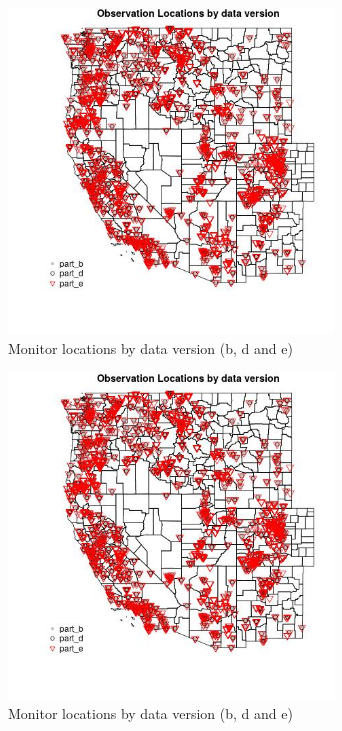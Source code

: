 
\begin{figure} 
\centering  
\includegraphics[width=0.77\textwidth]{Code_Outputs/PM25_obs_locations_by_data_version_Obs_Locations_versions_bde.jpg} 
\caption{\label{fig:PM25_obs_locations_by_data_versionObs_Locations_versions_bde}Monitor locations by data version (b, d and e)} 
\end{figure} 
 

\begin{figure} 
\centering  
\includegraphics[width=0.77\textwidth]{Code_Outputs/PM25_obs_locations_by_data_version_Obs_Locations_versions_bde.jpg} 
\caption{\label{fig:PM25_obs_locations_by_data_versionObs_Locations_versions_bde}Monitor locations by data version (b, d and e)} 
\end{figure} 
 

